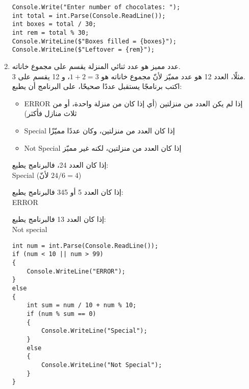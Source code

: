 ﻿\documentclass[12pt]{article}
\begin{document}
\begin{enumerate}[itemsep=2em]
\ifwithsols
\begin{boxSolution}
\begin{english}
\begin{verbatim}
Console.Write("Enter number of chocolates: ");
int total = int.Parse(Console.ReadLine());
int boxes = total / 30;
int rem = total % 30;
Console.WriteLine($"Boxes filled = {boxes}");
Console.WriteLine($"Leftover = {rem}");
\end{verbatim}
\end{english}
\end{boxSolution}
\clearpage
\fi

\item
عدد مميز هو عدد ثنائي المنزلة يقسم على مجموع خاناته. \\
مثلًا، العدد 12 هو عدد مميّز لأنّ مجموع خاناته هو $1+2=3$، و 12 يقسم على 3. \\
اكتب برنامجًا يستقبل عددًا صحيحًا، على البرنامج أن يطبع:
\begin{itemize}
    \item \textenglish{ERROR} إذا لم يكن العدد من  منزلتين (أي إذا كان من منزلة واحدة، أو من ثلاث منازل فأكثر)
    \item \textenglish{Special} إذا كان العدد من منزلتين، وكان عددًا مميّزًا
    \item \textenglish{Not Special} إذا كان العدد من منزلتين، لكنه غير مميّز
\end{itemize}
\begin{boxExample}[1]
    إذا كان العدد 24، فالبرنامج يطبع: \\
    \textenglish{Special}
    (لأنّ $24/6=4$)
\end{boxExample}
\begin{boxExample}[2]
    إذا كان العدد 5  أو  345 فالبرنامج يطبع: \\
    \textenglish{ERROR}
\end{boxExample}
\begin{boxExample}[3]
    إذا كان العدد 13 فالبرنامج يطبع: \\
    \textenglish{Not special}
\end{boxExample}

\ifwithsols
\begin{boxSolution}
\begin{english}
\begin{verbatim}
int num = int.Parse(Console.ReadLine());
if (num < 10 || num > 99)
{
    Console.WriteLine("ERROR");
}
else
{
    int sum = num / 10 + num % 10;
    if (num % sum == 0)
    {
        Console.WriteLine("Special");
    }
    else
    {
        Console.WriteLine("Not Special");
    }
}
\end{verbatim}
\end{english}
\end{boxSolution}
\fi

\end{enumerate}
\end{document}
